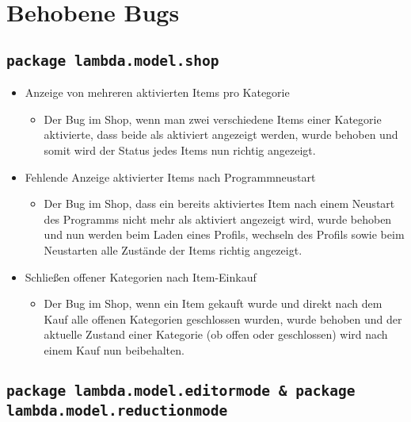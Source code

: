\section{Behobene Bugs}
\subsection{\texttt{package lambda.model.shop}}
\begin{itemize}
\item Anzeige von mehreren aktivierten Items pro Kategorie
\begin{itemize} 
\item Der Bug im Shop, wenn man zwei verschiedene Items einer Kategorie aktivierte, dass beide als aktiviert angezeigt werden, wurde behoben
	und somit wird der Status jedes Items nun richtig angezeigt.
	\end{itemize}
\end{itemize}

\begin{itemize}
\item Fehlende Anzeige aktivierter Items nach Programmneustart
\begin{itemize} 
\item Der Bug im Shop, dass ein bereits aktiviertes Item nach einem Neustart des Programms nicht mehr als aktiviert angezeigt wird, wurde behoben
	und nun werden beim Laden eines Profils, wechseln des Profils sowie beim Neustarten alle Zustände der Items richtig angezeigt.
	\end{itemize}
\end{itemize}

\begin{itemize}
\item Schließen offener Kategorien nach Item-Einkauf
\begin{itemize} 
\item Der Bug im Shop, wenn ein Item gekauft wurde und direkt nach dem Kauf alle offenen Kategorien geschlossen wurden, wurde behoben und
	der aktuelle Zustand einer Kategorie (ob offen oder geschlossen) wird nach einem Kauf nun beibehalten.
	\end{itemize}
\end{itemize}


\subsection{\texttt{package lambda.model.editormode & package lambda.model.reductionmode}}

